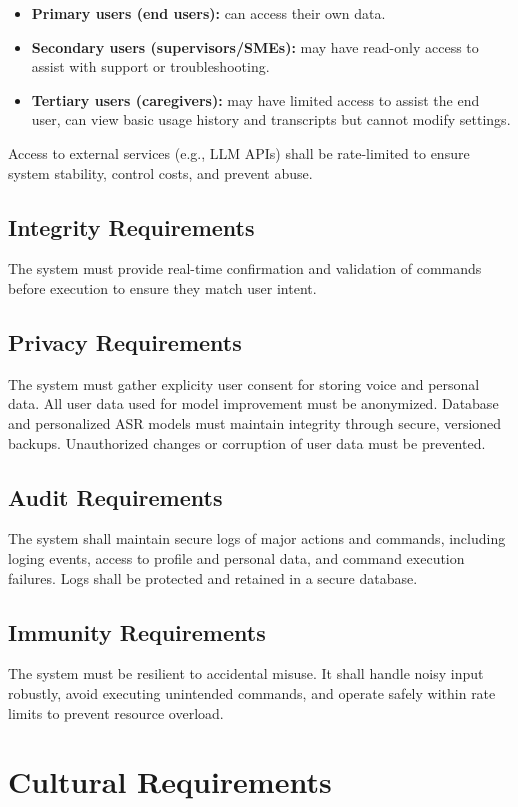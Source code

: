 \documentclass[12pt]{article}
\begin{document}
\begin{itemize}
    \item \textbf{Primary users (end users):} can access their own data.
    \item \textbf{Secondary users (supervisors/SMEs):} may have read-only access to assist with support or troubleshooting.
    \item \textbf{Tertiary users (caregivers):} may have limited access to assist the end user, can view basic usage history and transcripts but cannot modify settings.
\end{itemize}

Access to external services (e.g., LLM APIs) shall be rate-limited to ensure system stability, control costs, and prevent abuse.
\subsection{Integrity Requirements}
The system must provide real-time confirmation and validation of commands before execution to ensure they match user intent. 
\subsection{Privacy Requirements}
The system must gather explicity user consent for storing voice and personal data. All user data used for model improvement must be anonymized. Database and personalized ASR models must maintain integrity through secure, versioned backups. Unauthorized changes or corruption of user data must be prevented. 
\subsection{Audit Requirements}
The system shall maintain secure logs of major actions and commands, including loging events, access to profile and personal data, and command execution failures. Logs shall be protected and retained in a secure database. 
\subsection{Immunity Requirements}
The system must be resilient to accidental misuse. It shall handle noisy input robustly, avoid executing unintended commands, and operate safely within rate limits to prevent resource overload. 

\section{Cultural Requirements}
\end{document}
